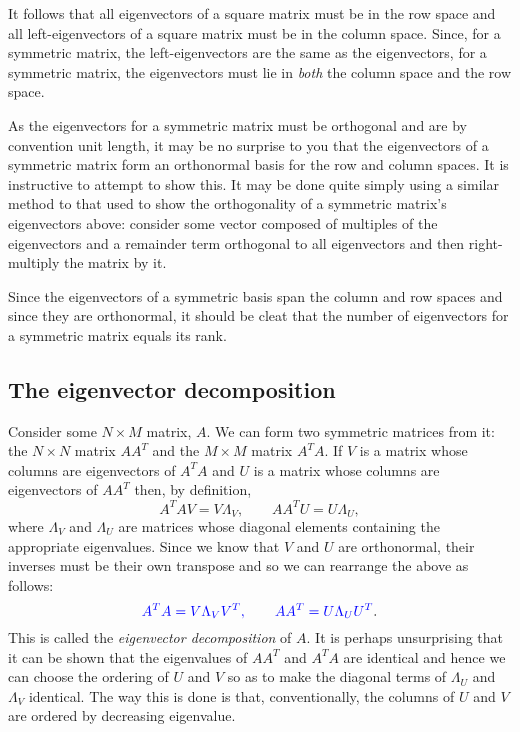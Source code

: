 \documentclass[a4paper]{article}
\newcommand{\highlight}[1]{{\color{blue}#1}}
\begin{document}
It follows that \highlight{all eigenvectors of a square matrix must be in the
row space} and \highlight{all left-eigenvectors of a square matrix must be in
the column space}. Since, for a symmetric matrix, the left-eigenvectors are the
same as the eigenvectors, \highlight{for a symmetric matrix, the eigenvectors
must lie in \emph{both} the column space and the row space}.

As the eigenvectors for a symmetric matrix must be orthogonal and are by
convention unit length, it may be no surprise to you that \highlight{the
eigenvectors of a symmetric matrix form an orthonormal basis for the row and
column spaces}. It is instructive to attempt to show this. It may be done quite
simply using a similar method to that used to show the orthogonality of
a symmetric matrix's eigenvectors above: consider some vector composed of
multiples of the eigenvectors and a remainder term orthogonal to all
eigenvectors and then right-multiply the matrix by it.

Since the eigenvectors of a symmetric basis span the column and row spaces and
since they are orthonormal, it should be cleat that \highlight{the number of
eigenvectors for a symmetric matrix equals its rank}.

\subsection{The eigenvector decomposition}

Consider some $N \times M$ matrix, $A$. We can form two symmetric matrices from
it: the $N \times N$ matrix $AA^T$ and the $M \times M$ matrix $A^TA$. If $V$ is
a matrix whose columns are eigenvectors of $A^TA$ and $U$ is a matrix whose
columns are eigenvectors of $AA^T$ then, by definition,
\[
  A^TA V = V \Lambda_V, \qquad AA^T U = U \Lambda_U,
\]
where $\Lambda_V$ and $\Lambda_U$ are matrices whose diagonal elements
containing the appropriate eigenvalues. Since we know that $V$ and $U$ are
orthonormal, their inverses must be their own transpose and so we can rearrange
the above as follows:
\[
  \highlight{A^TA = V \Lambda_V V^T, \qquad AA^T = U \Lambda_U U^T}.
\]
This is called the \emph{eigenvector decomposition} of $A$. It is perhaps
unsurprising that it can be shown that \highlight{the eigenvalues of $AA^T$ and
$A^TA$ are identical} and hence we can choose the ordering of $U$ and $V$ so as
to make the diagonal terms of $\Lambda_U$ and $\Lambda_V$ identical. The way
this is done is that, conventionally, \highlight{the columns of $U$ and $V$ are
ordered by decreasing eigenvalue}.
\end{document}
